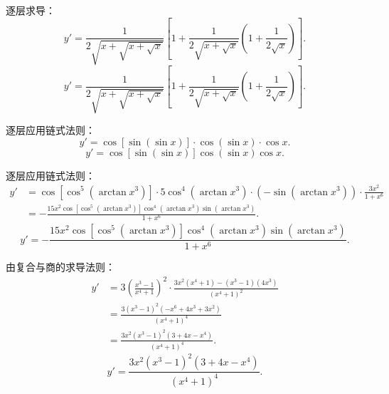\begin{solution}

    逐层求导：
    \begin{equation}
        y' = \frac{1}{2\sqrt{x+\sqrt{x+\sqrt{x}}}} \left[ 1 + \frac{1}{2\sqrt{x+\sqrt{x}}} \left( 1 + \frac{1}{2\sqrt{x}} \right) \right].
    \end{equation}
    \begin{equation}
        \boxed{y' = \frac{1}{2\sqrt{x+\sqrt{x+\sqrt{x}}}} \left[ 1 + \frac{1}{2\sqrt{x+\sqrt{x}}} \left( 1 + \frac{1}{2\sqrt{x}} \right) \right].}
    \end{equation}


    逐层应用链式法则：
    \begin{equation}
        y' = \cos[\sin(\sin x)] \cdot \cos(\sin x) \cdot \cos x.
    \end{equation}
    \begin{equation}
        \boxed{y' = \cos[\sin(\sin x)] \cos(\sin x) \cos x.}
    \end{equation}


    逐层应用链式法则：
    \begin{equation}
        \begin{aligned}
            y' & = \cos[\cos^5(\arctan x^3)] \cdot 5\cos^4(\arctan x^3) \cdot \left(-\sin(\arctan x^3)\right) \cdot \frac{3x^2}{1+x^6} \\
               & = -\frac{15x^2 \cos[\cos^5(\arctan x^3)] \cos^4(\arctan x^3) \sin(\arctan x^3)}{1+x^6}.
        \end{aligned}
    \end{equation}
    \begin{equation}
        \boxed{y' = -\frac{15x^2 \cos[\cos^5(\arctan x^3)] \cos^4(\arctan x^3) \sin(\arctan x^3)}{1+x^6}.}
    \end{equation}


    由复合与商的求导法则：
    \begin{equation}
        \begin{aligned}
            y' & = 3\left( \frac{x^3-1}{x^4+1} \right)^2 \cdot \frac{3x^2(x^4+1) - (x^3-1)(4x^3)}{(x^4+1)^2} \\
               & = \frac{3(x^3-1)^2 (-x^6 + 4x^3 + 3x^2)}{(x^4+1)^4}                                         \\
               & = \frac{3x^2(x^3-1)^2 (3 + 4x - x^4)}{(x^4+1)^4}.
        \end{aligned}
    \end{equation}
    \begin{equation}
        \boxed{y' = \frac{3x^2(x^3-1)^2 (3 + 4x - x^4)}{(x^4+1)^4}.}
    \end{equation}


\end{solution}
